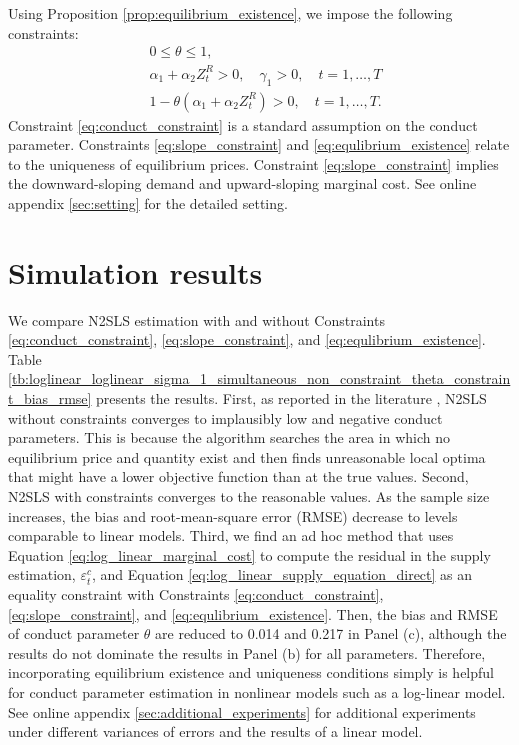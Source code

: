 \documentclass[11pt, a4paper]{article}
\begin{document}
Using Proposition \ref{prop:equilibrium_existence}, we impose the following constraints:
\begin{align}
    &0\le\theta \le 1,\label{eq:conduct_constraint}\\
    &\alpha_1 + \alpha_2 Z_{t}^{R} >0, \quad \gamma_1>0 ,\quad t = 1,\ldots, T\label{eq:slope_constraint}\\
    &1- \theta(\alpha_1 + \alpha_2 Z_{t}^{R}) >0,\quad t = 1,\ldots, T.\label{eq:equlibrium_existence}
\end{align}
Constraint \eqref{eq:conduct_constraint} is a standard assumption on the conduct parameter.
Constraints \eqref{eq:slope_constraint} and \eqref{eq:equlibrium_existence} relate to the uniqueness of equilibrium prices. 
Constraint \eqref{eq:slope_constraint} implies the downward-sloping demand and upward-sloping marginal cost. See online appendix \ref{sec:setting} for the detailed setting.

\section{Simulation results}\label{sec:results}

We compare N2SLS estimation with and without Constraints \eqref{eq:conduct_constraint}, \eqref{eq:slope_constraint}, and \eqref{eq:equlibrium_existence}.
Table \ref{tb:loglinear_loglinear_sigma_1_simultaneous_non_constraint_theta_constraint_bias_rmse} presents the results.
First, as reported in the literature \citep{merel2009measuring,okazaki2022excess}, N2SLS without constraints converges to implausibly low and negative conduct parameters.
This is because the algorithm searches the area in which no equilibrium price and quantity exist and then finds unreasonable local optima that might have a lower objective function than at the true values.
Second, N2SLS with constraints converges to the reasonable values. 
As the sample size increases, the bias and root-mean-square error (RMSE) decrease to levels comparable to linear models.
Third, we find an ad hoc method that uses Equation \eqref{eq:log_linear_marginal_cost} to compute the residual in the supply estimation, $\varepsilon_{t}^c$, and Equation \eqref{eq:log_linear_supply_equation_direct} as an equality constraint with  Constraints \eqref{eq:conduct_constraint}, \eqref{eq:slope_constraint}, and \eqref{eq:equlibrium_existence}. 
Then, the bias and RMSE of conduct parameter $\theta$ are reduced to 0.014 and 0.217 in Panel (c), although the results do not dominate the results in Panel (b) for all parameters.
Therefore, incorporating equilibrium existence and uniqueness conditions simply is helpful for conduct parameter estimation in nonlinear models such as a log-linear model.
See online appendix \ref{sec:additional_experiments} for additional experiments under different variances of errors and the results of a linear model. 
\end{document}
